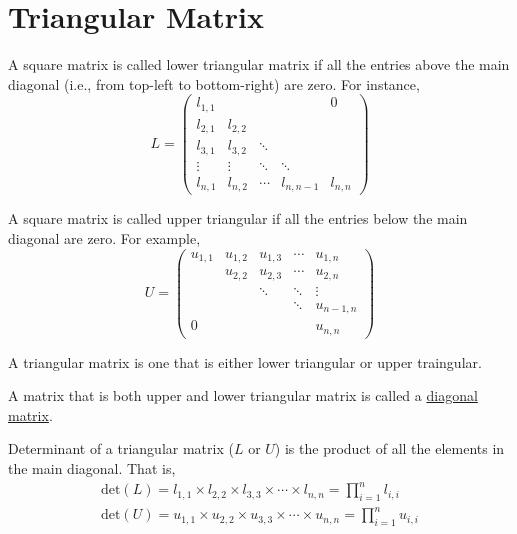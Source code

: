 \documentclass[conference,final,11pt,technote,onecolumn]{IEEEtran}\usepackage[]{graphicx}\usepackage[]{color}
\begin{document}
\section{Triangular Matrix}
\label{term:triangular_matrix}
A square matrix is called lower triangular matrix if all the entries above the main diagonal (i.e., from top-left to bottom-right) are zero\cite{wiki:TriangularMatrix}. For instance,
\[
L = \begin{pmatrix}
    	l_{1,1} &         &         &           &   0    \\
      l_{2,1} & l_{2,2} &         &           &        \\
      l_{3,1} & l_{3,2} & \ddots  &           &        \\
      \vdots  & \vdots  & \ddots  & \ddots    &        \\
      l_{n,1} & l_{n,2} & \cdots  & l_{n,n-1} & l_{n,n}
			\end{pmatrix} 
\]

A square matrix is called upper triangular if all the entries below the main diagonal are zero. For example,
\[
U = \begin{pmatrix}
      u_{1,1} & u_{1,2} & u_{1,3} & \cdots    &   u_{1,n}    \\
              & u_{2,2} & u_{2,3} & \cdots    &   u_{2,n}    \\
              &         & \ddots  & \ddots    &   \vdots     \\
              &         &         & \ddots    &   u_{n-1,n}  \\
      0       &         &         &           &   u_{n,n}
			\end{pmatrix} 
\]

A triangular matrix is one that is either lower triangular or upper traingular.

A matrix that is both upper and lower triangular matrix is called a \hyperref[term:diagonal_matrix]{diagonal matrix}.

Determinant of a triangular matrix ($L$ or $U$) is the product of all the elements in the main diagonal. That is, 
\begin{eqnarray}
\nonumber \text{det}(L) = l_{1,1}\times l_{2,2}\times l_{3,3}\times \cdots \times l_{n,n} = \prod_{i=1}^nl_{i,i}\\
\nonumber \text{det}(U) = u_{1,1}\times u_{2,2}\times u_{3,3}\times \cdots \times u_{n,n} = \prod_{i=1}^nu_{i,i}
\end{eqnarray}
\end{document}
